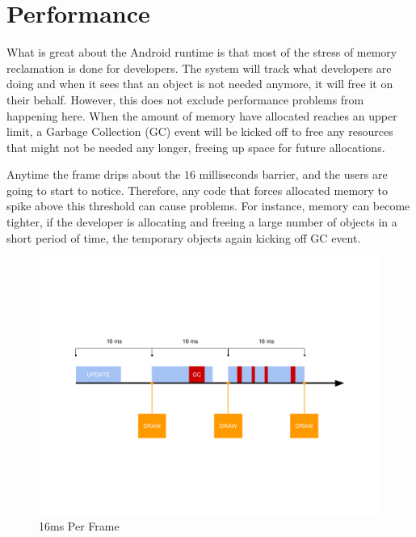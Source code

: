 \chapter{Performance}
\label{chapter-performance}

What is great about the Android runtime is that most of the stress of memory reclamation is done for developers. The system will track what developers are doing and when it sees that an object is not needed anymore, it will free it on their behalf. However, this does not exclude performance problems from happening here. When the amount of memory have allocated reaches an upper limit, a Garbage Collection (GC) event will be kicked off to free any resources that might not be needed any longer, freeing up space for future allocations. 

Anytime the frame drips about the $16$ milliseconds barrier, and the users are going to start to notice. Therefore, any code that forces allocated memory to spike above this threshold can cause problems. For instance, memory can become tighter, if the developer is allocating and freeing a large number of objects in a short period of time, the temporary objects again kicking off GC event. 

\begin{figure}[H]
\caption{16ms Per Frame}
\label{fig:16ms-per-frame}
\centering
\includegraphics[width=\textwidth, keepaspectratio]{Figures/16ms-per-frame.png}
\decoRule
\end{figure}

